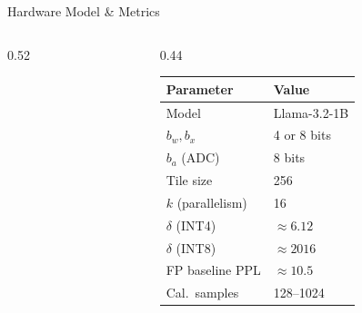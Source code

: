 \begin{frame}[shrink=20]{Hardware Model \& Metrics}
\begin{columns}[T]
\begin{column}{0.52\textwidth}
    \end{column}
    \begin{column}{0.44\textwidth}
      \vspace{0.3em}
      \begin{center}
      \begin{tabular}{ll}
        \toprule
        \textbf{Parameter} & \textbf{Value} \\
        \midrule
        Model & Llama-3.2-1B \\
        $b_w, b_x$ & 4 or 8 bits \\
        $b_a$ (ADC) & 8 bits \\
        Tile size & 256 \\
        $k$ (parallelism) & 16 \\
        $\delta$ (INT4) & $\approx 6.12$ \\
        $\delta$ (INT8) & $\approx 2016$ \\
        FP baseline PPL & $\approx 10.5$ \\
        Cal.\ samples & 128–1024 \\
        \bottomrule
      \end{tabular}
      \end{center}
    \end{column}
  \end{columns}
\end{frame}
